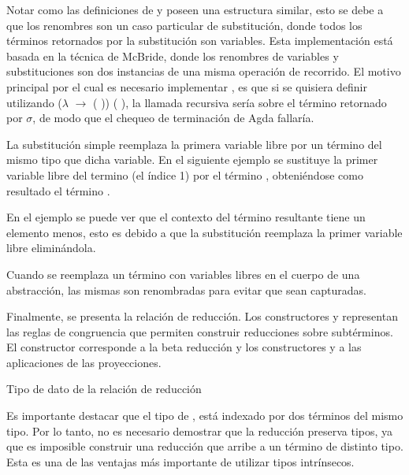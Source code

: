 Notar como las definiciones de  y  poseen una estructura similar, esto se debe a que los renombres son un caso particular de substitución, donde todos los términos retornados por la substitución son variables.
Esta implementación está basada en la técnica de McBride\cite{ren-sub}, donde los renombres de variables y substituciones son dos instancias de una misma operación de recorrido.
El motivo principal por el cual es necesario implementar , es que si se quisiera definir  utilizando  ($\lambda$  $\rightarrow$  ( )) (\bound{$\sigma$} ), la llamada recursiva sería sobre el término retornado por $\sigma$, de modo que el chequeo de terminación de Agda fallaría.

\begin{example}
	La substitución simple reemplaza la primera variable libre por un término del mismo tipo que dicha variable.
	En el siguiente ejemplo se sustituye la primer variable libre del termino  (el índice 1) por el término , obteniéndose como resultado el término .

\end{example}

En el ejemplo se puede ver que el contexto del término resultante tiene un elemento menos, esto es debido a que la substitución reemplaza la primer variable libre eliminándola.

\begin{example}
	Cuando se reemplaza un término con variables libres en el cuerpo de una abstracción, las mismas son renombradas para evitar que sean capturadas.
\end{example}

Finalmente, se presenta la relación de reducción.
Los constructores \const{$\xi$} y \const{$\zeta$} representan las reglas de congruencia que permiten construir reducciones sobre subtérminos.
El constructor  corresponde a la beta reducción y los constructores  y  a las aplicaciones de las proyecciones.

\begin{codigo}
	Tipo de dato de la relación de reducción
	
\end{codigo}

Es importante destacar que el tipo de \type{$\_\hookrightarrow\_$}, está indexado por dos términos del mismo tipo.
Por lo tanto, no es necesario demostrar que la reducción preserva tipos, ya que es imposible construir una reducción que arribe a un término de distinto tipo.
Esta es una de las ventajas más importante de utilizar tipos intrínsecos.

